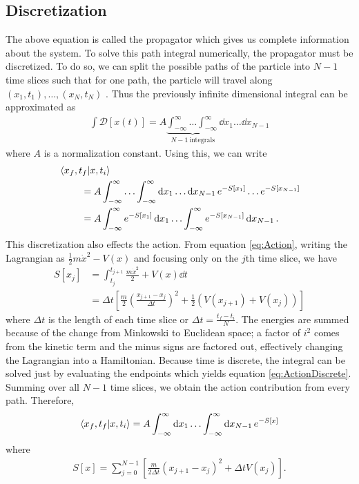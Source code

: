 \documentclass[11pt]{article}
\begin{document}
\subsection{Discretization}
The above equation is called the propagator which gives us complete information about the system. To solve this path integral numerically, the propagator must be discretized. To do so, we can split the possible paths of the particle into $N-1$ time slices such that for one path, the particle will travel along $(x_1,t_1),\ldots,(x_N,t_N)$ \cite{QuantumBook}. Thus the previously infinite dimensional integral can be approximated as
\begin{align} 
	\int\mathcal{D}[x(t)]=A\underbrace{\int_{-\infty}^{\infty}\ldots\int_{-\infty}^{\infty}}_{N-1\ \text{integrals}}\dd{x_1}\ldots\dd{x_{N-1}}
\end{align}
where $A$ is a normalization constant. Using this, we can write
\begin{align}
\begin{split}
	&\bra{x_f,t_f}\ket{x,t_i}\\
	&\qquad\ =A\int_{-\infty}^{\infty}\ldots\int_{-\infty}^{\infty}\dd{x_1}\ldots\dd{x_{N-1}}e^{-S[x_1]}\ldots e^{-S[x_{N-1}]}\\
	&\qquad\ =A\int_{-\infty}^{\infty}e^{-S[x_1]}\dd{x_1}\ldots\int_{-\infty}^{\infty}e^{-S[x_{N-1}]}\dd{x_{N-1}}.
\end{split}
\end{align}
This discretization also effects the action. From equation \ref{eq:Action}, writing the Lagrangian as $\frac{1}{2}m\dot{x}^2-V(x)$ and focusing only on the $j$th time slice, we have 
\begin{align}
	S[x_j]&=\int_{t_j}^{t_{j+1}}\frac{m\dot{x}^2}{2}+V(x)\dd{t}\\
	&=\Delta t\left[\frac{m}{2}\left(\frac{x_{j+1}-x_j}{\Delta t}\right)^2+\frac{1}{2}(V(x_{j+1})+V(x_j))\right]
	\label{eq:ActionDiscrete}
\end{align}
where $\Delta t$ is the length of each time slice or $\Delta t=\frac{t_f-t_i}{N}$. The energies are summed because of the change from Minkowski to Euclidean space; a factor of $i^2$ comes from the kinetic term and the minus signs are factored out, effectively changing the Lagrangian into a Hamiltonian.  Because time is discrete, the integral can be solved just by evaluating the endpoints which yields equation \ref{eq:ActionDiscrete}. Summing over all $N-1$ time slices, we obtain the action contribution from every path. Therefore,
\begin{align}
	\bra{x_f,t_f}\ket{x,t_i}=A\int_{-\infty}^{\infty}\dd{x_1}\ldots\int_{-\infty}^{\infty}\dd{x_{N-1}}e^{-S[x]}
	\label{eq:PathIntNum}
\end{align}
where
\begin{align}
	S[x]=\sum_{j=0}^{N-1}\left[\frac{m}{2\Delta t}(x_{j+1}-x_j)^2+\Delta tV(x_j)\right].
	\label{eq:ActionTot}
\end{align}
\end{document}
